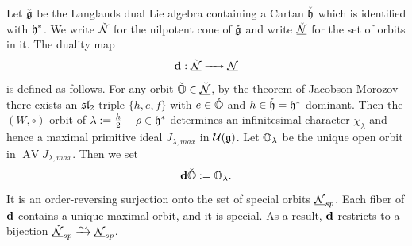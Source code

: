 \documentclass[reqno]{amsart}
\DeclareMathOperator{\Sat}{Sat}
\newcommand{\ubar}[1]{\underline{#1}}
\DeclareMathOperator{\AV}{AV}
\begin{document}
Let $\check {\mathfrak{g}}$ be the Langlands dual Lie algebra containing a Cartan $\check {\mathfrak{h}}$ which is identified with $\mathfrak{h}^*$. We write $\check {\mathcal{N}}$ for the nilpotent cone of $\check {\mathfrak{g}}$ and write $\ubar{\check \cN}$ for the set of orbits in it. %
The duality map
\begin{equation*}
	\bd: \ubar{\check \cN} \aro \ubar{\cN}
\end{equation*}
is defined as follows. For any orbit $\check \BO \in \ubar{\check \cN}$, by the theorem of Jacobson-Morozov there exists an $\mathfrak{sl}_2$-triple $\{h,e,f\}$ with $e \in \check {\mathbb{O}}$ and $h \in \check {\mathfrak{h}} = \mathfrak{h}^*$ dominant. Then the $(W,\circ)$-orbit of $\lambda := \frac h2 - \rho \in \mathfrak{h}^*$ determines an infinitesimal character $\chi_\lambda$ and hence a maximal primitive ideal $J_{\lambda,max}$ in $\mathcal{U}(\mathfrak{g})$. Let $\mathbb{O}_\lambda$ be the unique open orbit in $\AV J_{\lambda,max}$. Then we set
\begin{equation*}
	\mathbf{d} \check {\mathbb{O}} := \mathbb{O}_\lambda.
\end{equation*}
It is an order-reversing surjection onto the set of special orbits $\ubar \cN_{sp}$. Each fiber of $\mathbf{d}$ contains a unique maximal orbit, and it is special. As a result, $\mathbf{d}$ restricts to a bijection $\ubar{\check \cN}_{sp} \bij \ubar \cN_{sp}$.
\end{document}
